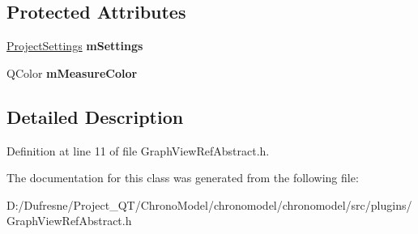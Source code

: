 \subsection*{Protected Attributes}
\begin{DoxyCompactItemize}
\item 
\hypertarget{class_graph_view_ref_abstract_aa76604c1569c25c0f456ba5b78ce163e}{\hyperlink{class_project_settings}{Project\-Settings} {\bfseries m\-Settings}}\label{class_graph_view_ref_abstract_aa76604c1569c25c0f456ba5b78ce163e}

\item 
\hypertarget{class_graph_view_ref_abstract_a1a449eca4531248f770890f022f53f98}{Q\-Color {\bfseries m\-Measure\-Color}}\label{class_graph_view_ref_abstract_a1a449eca4531248f770890f022f53f98}

\end{DoxyCompactItemize}


\subsection{Detailed Description}


Definition at line 11 of file Graph\-View\-Ref\-Abstract.\-h.



The documentation for this class was generated from the following file\-:\begin{DoxyCompactItemize}
\item 
D\-:/\-Dufresne/\-Project\-\_\-\-Q\-T/\-Chrono\-Model/chronomodel/chronomodel/src/plugins/Graph\-View\-Ref\-Abstract.\-h\end{DoxyCompactItemize}
